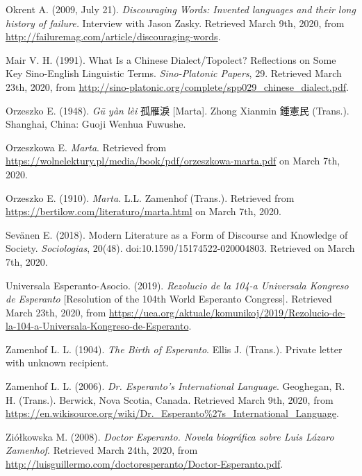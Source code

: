 Okrent A. (2009, July 21). \textit{Discouraging Words: Invented languages and their long history of failure.} Interview with Jason Zasky. Retrieved March 9th, 2020, from \url{http://failuremag.com/article/discouraging-words}.

Mair V. H. (1991). What Is a Chinese Dialect/Topolect? Reflections on Some Key Sino-English Linguistic Terms. \textit{Sino-Platonic Papers}, 29. Retrieved March 23th, 2020, from \url{http://sino-platonic.org/complete/spp029_chinese_dialect.pdf}.

Orzeszko E. (1948). \textit{Gū yàn lèi} 孤雁淚 [Marta]. Zhong Xianmin 鍾憲民 (Trans.). Shanghai, China: Guoji Wenhua Fuwushe.

Orzeszkowa E. \textit{Marta}. Retrieved from \url{https://wolnelektury.pl/media/book/pdf/orzeszkowa-marta.pdf} on March 7th, 2020.

Orzeszko E. (1910). \textit{Marta}. L.L. Zamenhof (Trans.). Retrieved from \url{https://bertilow.com/literaturo/marta.html} on March 7th, 2020.

Sevänen E. (2018). Modern Literature as a Form of Discourse and Knowledge of Society. \textit{Sociologias}, 20(48). doi:10.1590/15174522-020004803. Retrieved on March 7th, 2020.

Universala Esperanto-Asocio. (2019). \textit{Rezolucio de la 104-a Universala Kongreso de Esperanto} [Resolution of the 104th World Esperanto Congress]. Retrieved March 23th, 2020, from \url{https://uea.org/aktuale/komunikoj/2019/Rezolucio-de-la-104-a-Universala-Kongreso-de-Esperanto}.

Zamenhof L. L. (1904). \textit{The Birth of Esperanto}. Ellis J. (Trans.). Private letter with unknown recipient.

Zamenhof L. L. (2006). \textit{Dr. Esperanto's International Language}. Geoghegan, R. H. (Trans.). Berwick, Nova Scotia, Canada. Retrieved March 9th, 2020, from \url{https://en.wikisource.org/wiki/Dr._Esperanto\%27s_International_Language}.

Ziółkowska M. (2008). \textit{Doctor Esperanto. Novela biográfica sobre Luis Lázaro Zamenhof}. Retrieved March 24th, 2020, from \url{http://luisguillermo.com/doctoresperanto/Doctor-Esperanto.pdf}.